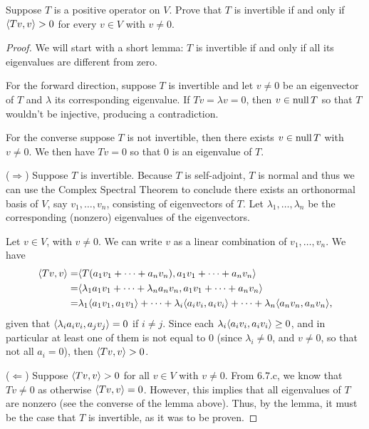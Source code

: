 \begin{exercise}{7}
  Suppose $T$ is a positive operator on $V$. Prove that $T$ is invertible if and only if $\langle Tv,v\rangle>0$ for every $v\in V$ with $v\neq 0$.
\end{exercise}
\begin{proof}
 We will start with a short lemma: $T$ is invertible if and only if all its eigenvalues are different from zero. 
 
 For the forward direction, suppose $T$ is invertible and let $v\neq 0$ be an eigenvector of $T$ and $\lambda$ its corresponding eigenvalue. If $Tv =\lambda v =0$, then $v\in\operatorname*{null} T$ so that $T$ wouldn't be injective, producing a contradiction.

 For the converse suppose $T$ is not invertible, then there exists $v\in\operatorname*{null} T$ with $v\neq 0$. We then have $Tv=0$ so that 0 is an eigenvalue of $T$.
 
 ($\Rightarrow$) 
 Suppose $T$ is invertible. Because $T$ is self-adjoint, $T$ is normal and thus we can use the Complex Spectral Theorem to conclude there exists an orthonormal basis of $V$, say $v_1,\dots,v_n$, consisting of eigenvectors of $T$. Let $\lambda_1,\dots,\lambda_n$ be the corresponding (nonzero) eigenvalues of the eigenvectors.

 Let $v\in V$, with $v\neq 0$. We can write $v$ as a linear combination of $v_1,\dots,v_n$. We have
 \begin{align*}
     \langle Tv,v\rangle =& \langle T(a_1v_1+\dots+a_nv_n),a_1v_1+\dots+a_nv_n\rangle\\
     =& \langle \lambda_1a_1v_1+\dots+\lambda_na_nv_n,a_1v_1+\dots+a_nv_n\rangle\\
     =& \lambda_1\langle a_1v_1,a_1v_1\rangle+\dots+\lambda_i\langle a_iv_i,a_iv_i\rangle+\dots+\lambda_n\langle a_nv_n,a_nv_n\rangle,
 \end{align*}
given that $\langle \lambda_ia_iv_i,a_jv_j\rangle=0$ if $i\neq j$. Since each $\lambda_i\langle a_iv_i,a_iv_i\rangle\geq 0$, and in particular at least one of them is not equal to 0 (since $\lambda_i\neq 0$, and $v\neq 0$, so that not all $a_i =0$), then $\langle Tv,v\rangle>0$.

 ($\Leftarrow$) Suppose $\langle Tv,v\rangle>0$ for all $v\in V$ with $v\neq 0$. From 6.7.c, we know that $Tv\neq 0$ as otherwise $\langle Tv,v\rangle=0$. However, this implies that all eigenvalues of $T$ are nonzero (see the converse of the lemma above). Thus, by the lemma, it must be the case that $T$ is invertible, as it was to be proven.
\end{proof}

